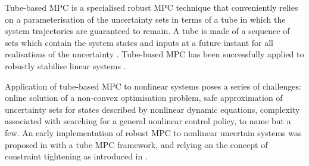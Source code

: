 \documentclass[letterpaper, 10 pt, conference]{ieeeconf}
\begin{document}
Tube-based MPC is a specialised robust MPC technique that conveniently relies on a parameterisation of the uncertainty sets in terms of a tube in which the system trajectories are guaranteed to remain. A tube is made of a sequence of sets which contain the system states and inputs at a future instant for all realisations of the uncertainty \cite{kouvaritakis}. %
%
Tube-based MPC has been successfully applied to robustly stabilise linear systems \cite{gossner1997stable, schuurmans2000robust, lee1999constrained, chisci2001systems, goulart, langson2004robust, rakovic2012homothetic, mayne2005robust}. %

Application of tube-based MPC to nonlinear systems poses a series of challenges: online solution of a non-convex optimisation problem, safe approximation of uncertainty sets for states described by nonlinear dynamic equations, complexity associated with searching for a general nonlinear control policy, to name but a few. An early implementation of robust MPC to nonlinear uncertain systems was proposed in \cite{mayne2007tube} with a tube MPC  framework, and relying on the concept of constraint tightening as introduced in \cite{michalska1993robust}. %
\end{document}
